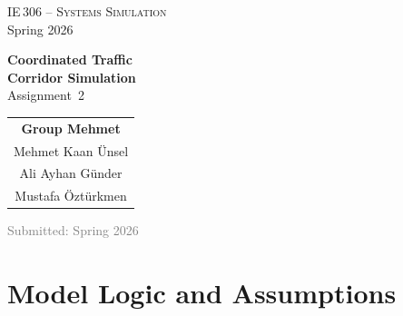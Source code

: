 \documentclass[11pt,a4paper]{article}
\begin{document}
\thispagestyle{empty}

\vspace*{-1.2cm}

\begin{center}
  {\color{white}\LARGE\textsc{IE\,306 -- Systems Simulation}}\\[6pt]
  {\color{white}\Large Spring 2026}
\end{center}

\vspace{3.5cm}

\begin{center}
  {\Huge\bfseries\color{BilkentBlue} Coordinated Traffic\\[4pt]
   Corridor Simulation}\\[1.2cm]
  {\Large\color{BilkentBlue!70!black} Assignment~2}\\[2cm]
  {\large
    \begin{tabular}{c}
      \textbf{Group Mehmet}\\[8pt]
      Mehmet Kaan \"Unsel\\[3pt]
      Ali Ayhan G\"under\\[3pt]
      Mustafa \"Ozt\"urkmen
    \end{tabular}}
\end{center}

\vfill

\begin{center}
  \textcolor{gray}{\small Submitted: Spring 2026}
\end{center}

\newpage

\tableofcontents
\newpage

\section{Model Logic and Assumptions}
\label{sec:model}
\end{document}
